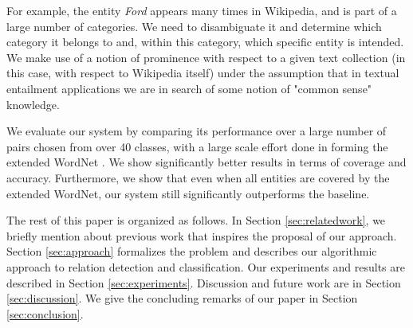 For example, the entity {\em Ford} appears many times in
Wikipedia, and is part of a large number of categories. We need
to disambiguate it and determine which category it belongs to
and, within this category, which specific entity is intended.
We
make use of a notion of prominence with respect to a given
text collection (in this case, with respect to Wikipedia
itself) under the assumption that in textual entailment
applications we are in search of some notion of "common sense"
knowledge.

We evaluate our system by comparing its performance over a
large number of pairs chosen from over 40 classes, with a large
scale effort done in forming the extended WordNet \cite{Snow2006}. We show significantly better results in
terms of coverage and accuracy.
Furthermore, we show that even when all entities are covered by the extended WordNet, our system still significantly outperforms the baseline.

The rest of this paper is organized as follows. In Section
\ref{sec:relatedwork}, we briefly mention about previous work that inspires the proposal of our approach.
Section \ref{sec:approach} formalizes the problem and describes our
algorithmic approach to relation detection and classification.
Our experiments and results are described in Section
\ref{sec:experiments}. Discussion and future work are in
Section \ref{sec:discussion}. We
give the concluding remarks of our paper in Section \ref{sec:conclusion}.

%



